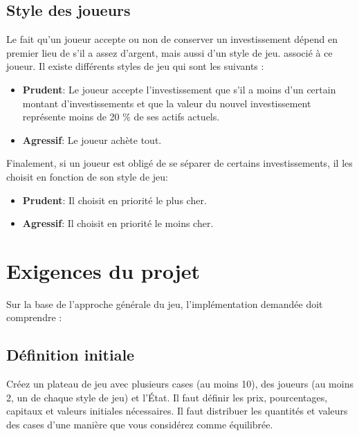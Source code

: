 \documentclass[12pt]{article}
\begin{document}
    \subsection{Style des joueurs}
    Le fait qu'un joueur accepte ou non de conserver un investissement dépend en premier lieu 
    de s'il a assez d'argent, mais aussi d'un style de jeu. associé à ce joueur. 
    Il existe différents styles de jeu qui sont les suivants :
        \begin{itemize}
           \item \textbf{Prudent}: Le joueur accepte l'investissement que s'il a moins d'un certain montant 
           d'investissements et que la valeur du nouvel investissement représente moins de 20 \% de ses
           actifs actuels.
           \item  \textbf{Agressif}: Le joueur achète tout.
        \end{itemize}

    Finalement, si un joueur est obligé de se séparer de certains investissements, 
    il les choisit en fonction de son style de jeu:
        \begin{itemize}
            \item \textbf{Prudent}: Il choisit en priorité le plus cher.
            \item \textbf{Agressif}: Il choisit en priorité le moins cher.
        \end{itemize}
        
\section{Exigences du projet}
Sur la base de l'approche générale du jeu, l'implémentation demandée doit comprendre :

\subsection{Définition initiale}
Créez un plateau de jeu avec plusieurs cases (au moins 10), des joueurs (au moins 2, un de
chaque style de jeu) et l'État. Il faut définir les prix, pourcentages, capitaux et valeurs initiales nécessaires. 
Il faut distribuer les quantités et valeurs des cases d'une manière que vous considérez comme équilibrée.
\end{document}
